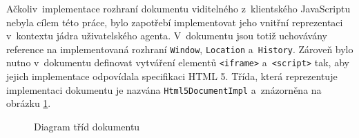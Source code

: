 Ačkoliv~implementace rozhraní dokumentu viditelného z~klientského JavaScriptu nebyla cílem této práce, bylo zapotřebí implementovat jeho vnitřní reprezentaci v~kontextu jádra uživatelského agenta. V~dokumentu jsou totiž uchovávány reference na implementovaná rozhraní \texttt{Window}, \texttt{Location} a~\texttt{History}. Zároveň bylo nutno v~dokumentu definovat vytváření elementů \texttt{<iframe>} a~\texttt{<script>} tak, aby jejich implementace odpovídala specifikaci HTML 5. Třída, která reprezentuje implementaci dokumentu je nazvána \texttt{Html5DocumentImpl} a~znázorněna na obrázku \ref{Figure.DocumentImpl}. 

\begin{figure}[H]
  \begin{center}
    \caption{Diagram tříd dokumentu}
    \label{Figure.DocumentImpl}
  \end{center}
\end{figure}

